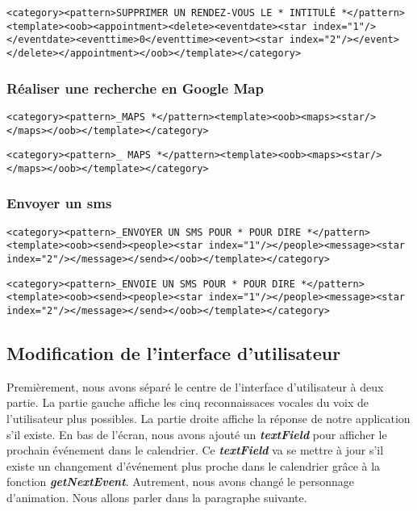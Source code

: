 \begin{lstlisting}[frame=none,aboveskip=0.5em]
<category><pattern>SUPPRIMER UN RENDEZ-VOUS LE * INTITULÉ *</pattern><template><oob><appointment><delete><eventdate><star index="1"/></eventdate><eventtime>0</eventtime><event><star index="2"/></event></delete></appointment></oob></template></category>
\end{lstlisting}

\subsubsection{Réaliser une recherche en Google Map}
\begin{lstlisting}[frame=none,aboveskip=0.5em]
<category><pattern>_MAPS *</pattern><template><oob><maps><star/></maps></oob></template></category>
\end{lstlisting}

\begin{lstlisting}[frame=none,aboveskip=0.5em]
<category><pattern>_ MAPS *</pattern><template><oob><maps><star/></maps></oob></template></category>
\end{lstlisting}

\subsubsection{Envoyer un sms}
\begin{lstlisting}[frame=none,aboveskip=0.5em]
<category><pattern>_ENVOYER UN SMS POUR * POUR DIRE *</pattern><template><oob><send><people><star index="1"/></people><message><star index="2"/></message></send></oob></template></category>
\end{lstlisting}

\begin{lstlisting}[frame=none,aboveskip=0.5em,belowskip=1.5em]
<category><pattern>_ENVOIE UN SMS POUR * POUR DIRE *</pattern><template><oob><send><people><star index="1"/></people><message><star index="2"/></message></send></oob></template></category>
\end{lstlisting}



\subsection{Modification de l'interface d'utilisateur}
\indent Premièrement, nous avons séparé le centre de l'interface d'utilisateur à deux partie. La partie gauche affiche les cinq reconnaissaces vocales du voix de l'utilisateur plus possibles. La partie droite affiche la réponse de notre application s'il existe. En bas de l'écran, nous avons ajouté un \textbf{\emph{textField}} pour afficher le prochain événement dans le calendrier. Ce \textbf{\emph{textField}} va se mettre à jour s'il existe un changement d'événement plus proche dans le calendrier grâce à la fonction \textbf{\emph{getNextEvent}}. Autrement, nous avons changé le personnage d'animation. Nous allons parler dans la paragraphe suivante.

